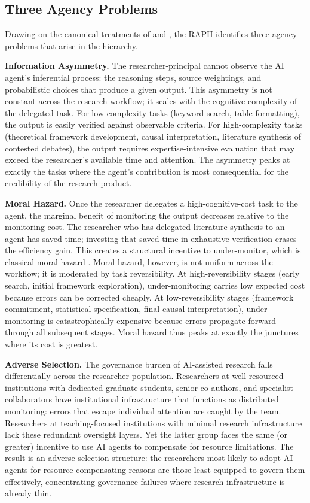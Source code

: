 \documentclass[12pt]{article}
\begin{document}
\subsection{Three Agency Problems}

Drawing on the canonical treatments of \citet{jensen1976theory} and \citet{waterman1998agents},
the RAPH identifies three agency problems that arise in the hierarchy.

\textbf{Information Asymmetry.}
The researcher-principal cannot observe the AI agent's inferential process: the reasoning
steps, source weightings, and probabilistic choices that produce a given output. This
asymmetry is not constant across the research workflow; it scales with the cognitive
complexity of the delegated task. For low-complexity tasks (keyword search, table formatting),
the output is easily verified against observable criteria. For high-complexity tasks
(theoretical framework development, causal interpretation, literature synthesis of contested
debates), the output requires expertise-intensive evaluation that may exceed the researcher's
available time and attention. The asymmetry peaks at exactly the tasks where the agent's
contribution is most consequential for the credibility of the research product.

\textbf{Moral Hazard.}
Once the researcher delegates a high-cognitive-cost task to the agent, the marginal benefit
of monitoring the output decreases relative to the monitoring cost. The researcher who has
delegated literature synthesis to an agent has saved time; investing that saved time in
exhaustive verification erases the efficiency gain. This creates a structural incentive to
under-monitor, which is classical moral hazard \citep{holmstrom1979moral}. Moral hazard,
however, is not uniform across the workflow; it is moderated by task reversibility.
At high-reversibility stages (early search, initial framework exploration), under-monitoring
carries low expected cost because errors can be corrected cheaply. At low-reversibility
stages (framework commitment, statistical specification, final causal interpretation),
under-monitoring is catastrophically expensive because errors propagate forward through
all subsequent stages. Moral hazard thus peaks at exactly the junctures where its cost is
greatest.

\textbf{Adverse Selection.}
The governance burden of AI-assisted research falls differentially across the researcher
population. Researchers at well-resourced institutions with dedicated graduate students,
senior co-authors, and specialist collaborators have institutional infrastructure that
functions as distributed monitoring: errors that escape individual attention are caught by
the team. Researchers at teaching-focused institutions with minimal research infrastructure
lack these redundant oversight layers. Yet the latter group faces the same (or greater)
incentive to use AI agents to compensate for resource limitations. The result is an adverse
selection structure: the researchers most likely to adopt AI agents for resource-compensating
reasons are those least equipped to govern them effectively, concentrating governance failures
where research infrastructure is already thin.
\end{document}
